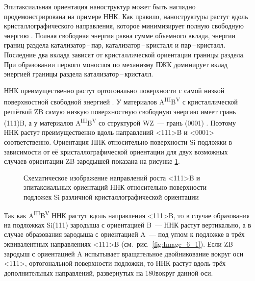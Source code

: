 Эпитаксиальная ориентация наноструктур может быть наглядно продемонстрирована
на примере ННК. Как правило, наноструктуры растут вдоль кристаллографического
направления, которое минимизирует полную свободную энергию \cite{Wagner1964}.
Полная свободная энергия равна сумме объемного вклада, энергии границ раздела
катализатор\,--\,пар, катализатор\,--\,кристалл и пар\,--\,кристалл. Последние
два вклада зависят от кристаллической ориентации границы раздела. При
образовании первого монослоя по механизму ПЖК доминирует вклад энергией границы
раздела катализатор\,--\,кристалл.

ННК преимущественно растут ортогонально поверхности с самой низкой
поверхностной свободной энергией \cite{Wagner1964}. У материалов
A\textsuperscript{III}B\textsuperscript{V} с кристаллической решёткой ZB самую
низкую поверхностную свободную энергию имеет грань (111)B, а у материалов
A\textsuperscript{III}B\textsuperscript{V} со структурой WZ~--- грань (0001)
\cite{Fortuna2010}. Поэтому ННК растут преимущественно вдоль направлений <111>B
и <0001> соответственно. Ориентация ННК относительно поверхности Si подложки в
зависимости от её кристаллографической ориентации для двух возможных случаев
ориентации ZB зародышей показана на рисунке \cref{fig:Image_6}.

\begin{figure}[ht]   \caption{Схематическое
изображение направлений роста <111>B и эпитаксиальных ориентаций ННК
относительно поверхности подложек Si различной кристаллографической
ориентации}\label{fig:Image_6} \end{figure}

Так как A\textsuperscript{III}B\textsuperscript{V} ННК растут вдоль направления
<111>B, то в случае образования на подложках Si(111) зародыша с ориентацией
B~--- ННК растут вертикально, а в случае образования зародыша с ориентацией
A~--- под углом к подложке в трёх эквивалентных направлениях <111>B
(см.~рис.~\cref{fig:Image_6_1}). Если ZB зародыш с ориентацией A испытывает
вращательное двойникование вокруг оси <111>, ортогональной поверхности
подложки, то ННК растут вдоль трёх дополнительных направлений, развернутых на
180\textdegree вокруг данной оси.

